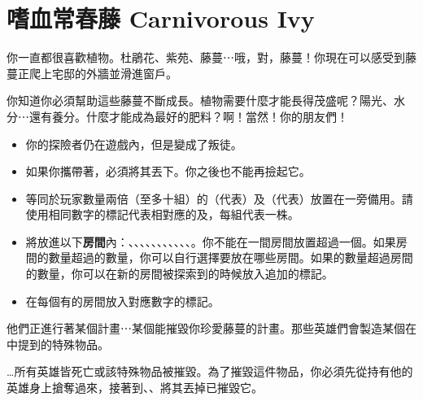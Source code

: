 
\chapter{嗜血常春藤 Carnivorous Ivy}

\begin{HauntStory}
	你一直都很喜歡植物。杜鵑花、紫苑、藤蔓⋯哦，對，藤蔓！你現在可以感受到藤蔓正爬上宅邸的外牆並滑進窗戶。

	你知道你必須幫助這些藤蔓不斷成長。植物需要什麼才能長得茂盛呢？陽光、水分⋯還有養分。什麼才能成為最好的肥料？啊！當然！你的朋友們！
\end{HauntStory}

\vspace*{-1em}
\begin{itemize}
	\item 你的探險者仍在遊戲內，但是變成了叛徒。
	\item 如果你攜帶著，必須將其丟下。你之後也不能再撿起它。
	\item 等同於玩家數量兩倍（至多十組）的（代表）及（代表）放置在一旁備用。請使用相同數字的標記代表相對應的及，每組代表一株。
	\item 將放進以下\textbf{房間}內：、、、、、、、、、、、。你不能在一間房間放置超過一個。如果房間的數量超過的數量，你可以自行選擇要放在哪些房間。如果的數量超過房間的數量，你可以在新的房間被探索到的時候放入追加的標記。
	\item 在每個有的房間放入對應數字的標記。
\end{itemize}

他們正進行著某個計畫⋯某個能摧毀你珍愛藤蔓的計畫。那些英雄們會製造某個在中提到的特殊物品。

…所有英雄皆死亡或該特殊物品被摧毀。為了摧毀這件物品，你必須先從持有他的英雄身上搶奪過來，接著到、、將其丟掉已摧毀它。

\vfill\null\pagebreak

